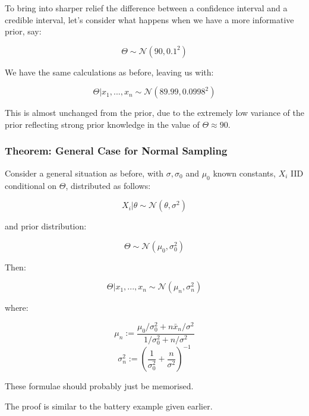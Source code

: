 \documentclass[a4paper]{article}
\begin{document}
                To bring into sharper relief the difference between a confidence
                interval and a credible interval, let's consider what happens
                when we have a more informative prior, say:

                \[
                    \Theta \sim \mathcal{N}(90, 0.1^2)
                \]

                We have the same calculations as before, leaving us with:

                \[
                    \Theta | x_1, ..., x_n \sim \mathcal{N}(89.99, 0.0998^2)
                \]

                This is almost unchanged from the prior, due to the extremely
                low variance of the prior reflecting strong prior knowledge in
                the value of $\Theta \approx 90$.

            \subsubsection{Theorem: General Case for Normal Sampling}
                Consider a general situation as before, with $\sigma, \sigma_0$
                and $\mu_0$ known constants, $X_i$ IID conditional on $\Theta$,
                distributed as follows:

                \[
                    X_i | \theta \sim \mathcal{N}(\theta, \sigma^2)
                \]

                and prior distribution:

                \[
                    \Theta \sim \mathcal{N}(\mu_0, \sigma_0^2)
                \]

                Then:

                \[
                    \Theta | x_1, ..., x_n \sim \mathcal{N}(\mu_n, \sigma^2_n)
                \]

                where:

                \[
                    \mu_n := \frac{\mu_0/\sigma_0^2 + n\bar x_n/\sigma^2}
                    {1/\sigma_0^2 + n/\sigma^2}
                \]
                \[
                    \sigma_n^2 := \left(\frac{1}{\sigma_0^2} +
                    \frac{n}{\sigma^2}\right)^{-1}
                \]

                These formulae should probably just be memorised.

                The proof is similar to the battery example given earlier.
\end{document}
